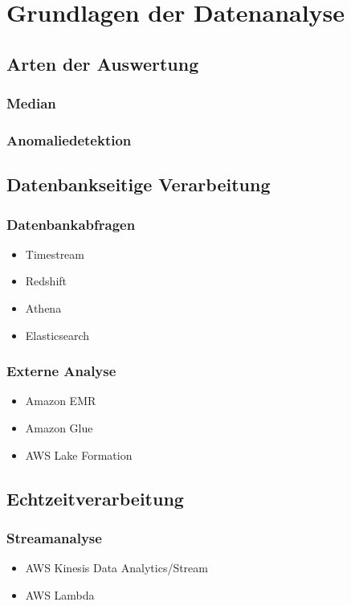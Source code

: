 \section{Grundlagen der Datenanalyse}

\subsection{Arten der Auswertung}
\subsubsection{Median}
\subsubsection{Anomaliedetektion}

\subsection{Datenbankseitige Verarbeitung}
\subsubsection{Datenbankabfragen}
\begin{itemize}
\item Timestream
\item Redshift
\item Athena
\item Elasticsearch
\end{itemize}

\subsubsection{Externe Analyse}
\begin{itemize}
\item Amazon EMR
\item Amazon Glue
\item AWS Lake Formation
\end{itemize}


\subsection{Echtzeitverarbeitung}
\subsubsection{Streamanalyse}
\begin{itemize}
\item AWS Kinesis Data Analytics/Stream
\item AWS Lambda
\end{itemize}

